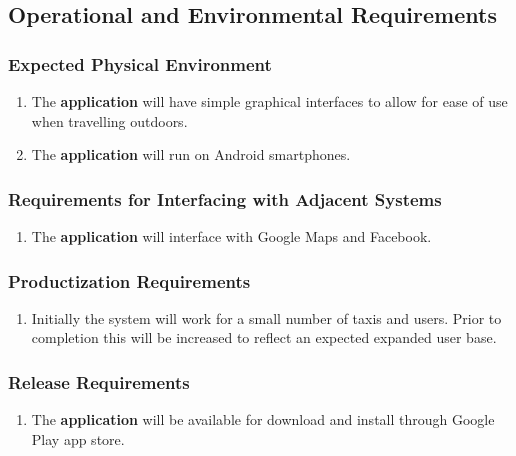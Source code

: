 \documentclass[english]{article}
\begin{document}
\subsection{Operational and Environmental Requirements}
\label{sub:operational_and_environmental_requirements}

\subsubsection{Expected Physical Environment}
\label{ssub:expected_physical_environment}
\begin{enumerate}[{EPE}1. ]
	\item The \textbf{application} will have simple graphical interfaces to allow for ease of use when travelling outdoors.
	\item The \textbf{application} will run on Android smartphones.
\end{enumerate}

\subsubsection{Requirements for Interfacing with Adjacent Systems}
\label{ssub:requirements_for_interfacing_with_adjacent_systems}
\begin{enumerate}[{RIAS}1. ]
	\item The \textbf{application} will interface with Google Maps and Facebook.
\end{enumerate}

\subsubsection{Productization Requirements}
\label{ssub:productization_requirements}
\begin{enumerate}[{PR}1. ]
	\item Initially the system will work for a small number of taxis and users. Prior to completion this will be increased to reflect an expected expanded user base.
\end{enumerate}

\subsubsection{Release Requirements}
\label{ssub:release_requirements}
\begin{enumerate}[{RR}1. ]
	\item The \textbf{application} will be available for download and install through Google Play app store.
\end{enumerate}
\end{document}
